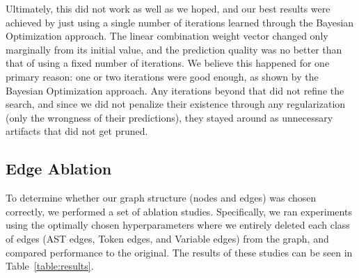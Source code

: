 Ultimately, this did not work as well as we hoped, and our best results were achieved by just using a single number of iterations learned through the Bayesian Optimization approach.
The linear combination weight vector changed only marginally from its initial value, and the prediction quality was no better than that of using a fixed number of iterations.
We believe this happened for one primary reason: one or two iterations were good enough, as shown by the Bayesian Optimization approach.
Any iterations beyond that did not refine the search, and since we did not penalize their existence through any regularization (only the wrongness of their predictions), they stayed around as unnecessary artifacts that did not get pruned.


\subsection{Edge Ablation}
To determine whether our graph structure (nodes and edges) was chosen correctly, we performed a set of ablation studies.
Specifically, we ran experiments using the optimally chosen hyperparameters where we entirely deleted each class of edges (AST edges, Token edges, and Variable edges) from the graph, and compared performance to the original.
The results of these studies can be seen in Table~\ref{table:results}.


